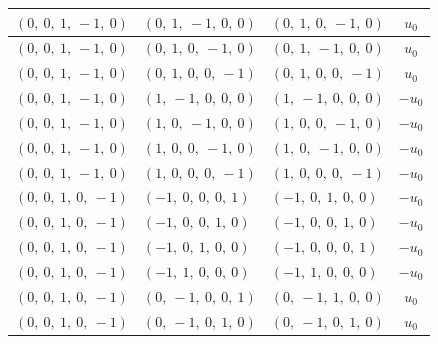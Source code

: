 \documentclass[11pt]{article}
\theoremstyle{definition}
\begin{document}
\begin{longtable}{|l|l|l|c|}
    \hline
    $\left( 0, \  0, \  1, \  -1, \  0\right)$ & $\left( 0, \  1, \  -1, \  0, \  0\right)$ & $\left( 0, \  1, \  0, \  -1, \  0\right)$ & $u_{0}$ \\
    \hline
    $\left( 0, \  0, \  1, \  -1, \  0\right)$ & $\left( 0, \  1, \  0, \  -1, \  0\right)$ & $\left( 0, \  1, \  -1, \  0, \  0\right)$ & $u_{0}$ \\
    \hline
    $\left( 0, \  0, \  1, \  -1, \  0\right)$ & $\left( 0, \  1, \  0, \  0, \  -1\right)$ & $\left( 0, \  1, \  0, \  0, \  -1\right)$ & $u_{0}$ \\
    \hline
    $\left( 0, \  0, \  1, \  -1, \  0\right)$ & $\left( 1, \  -1, \  0, \  0, \  0\right)$ & $\left( 1, \  -1, \  0, \  0, \  0\right)$ & $- u_{0}$ \\
    \hline
    $\left( 0, \  0, \  1, \  -1, \  0\right)$ & $\left( 1, \  0, \  -1, \  0, \  0\right)$ & $\left( 1, \  0, \  0, \  -1, \  0\right)$ & $- u_{0}$ \\
    \hline
    $\left( 0, \  0, \  1, \  -1, \  0\right)$ & $\left( 1, \  0, \  0, \  -1, \  0\right)$ & $\left( 1, \  0, \  -1, \  0, \  0\right)$ & $- u_{0}$ \\
    \hline
    $\left( 0, \  0, \  1, \  -1, \  0\right)$ & $\left( 1, \  0, \  0, \  0, \  -1\right)$ & $\left( 1, \  0, \  0, \  0, \  -1\right)$ & $- u_{0}$ \\
    \hline
    $\left( 0, \  0, \  1, \  0, \  -1\right)$ & $\left( -1, \  0, \  0, \  0, \  1\right)$ & $\left( -1, \  0, \  1, \  0, \  0\right)$ & $- u_{0}$ \\
    \hline
    $\left( 0, \  0, \  1, \  0, \  -1\right)$ & $\left( -1, \  0, \  0, \  1, \  0\right)$ & $\left( -1, \  0, \  0, \  1, \  0\right)$ & $- u_{0}$ \\
    \hline
    $\left( 0, \  0, \  1, \  0, \  -1\right)$ & $\left( -1, \  0, \  1, \  0, \  0\right)$ & $\left( -1, \  0, \  0, \  0, \  1\right)$ & $- u_{0}$ \\
    \hline
    $\left( 0, \  0, \  1, \  0, \  -1\right)$ & $\left( -1, \  1, \  0, \  0, \  0\right)$ & $\left( -1, \  1, \  0, \  0, \  0\right)$ & $- u_{0}$ \\
    \hline
    $\left( 0, \  0, \  1, \  0, \  -1\right)$ & $\left( 0, \  -1, \  0, \  0, \  1\right)$ & $\left( 0, \  -1, \  1, \  0, \  0\right)$ & $u_{0}$ \\
    \hline
    $\left( 0, \  0, \  1, \  0, \  -1\right)$ & $\left( 0, \  -1, \  0, \  1, \  0\right)$ & $\left( 0, \  -1, \  0, \  1, \  0\right)$ & $u_{0}$ \\

\end{longtable}
\end{document}

